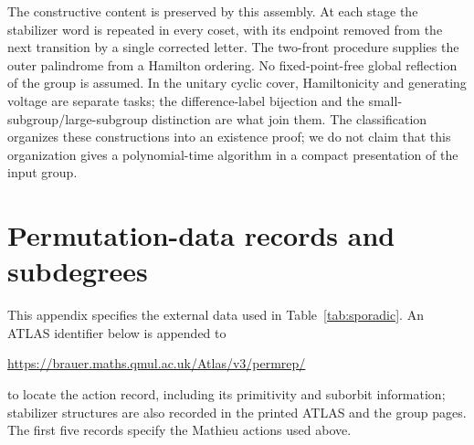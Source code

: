 \documentclass[11pt]{article}
\theoremstyle{definition}
\begin{document}
The constructive content is preserved by this assembly. At each stage the stabilizer word is repeated in every coset, with its endpoint removed from the next transition by a single corrected letter. The two-front procedure supplies the outer palindrome from a Hamilton ordering. No fixed-point-free global reflection of the group is assumed. In the unitary cyclic cover, Hamiltonicity and generating voltage are separate tasks; the difference-label bijection and the small-subgroup/large-subgroup distinction are what join them. The classification organizes these constructions into an existence proof; we do not claim that this organization gives a polynomial-time algorithm in a compact presentation of the input group.

\appendix
\section{Permutation-data records and subdegrees}\label{app:data}
This appendix specifies the external data used in Table~\ref{tab:sporadic}. An ATLAS identifier below is appended to
\begin{center}\url{https://brauer.maths.qmul.ac.uk/Atlas/v3/permrep/}\end{center}
to locate the action record, including its primitivity and suborbit information; stabilizer structures are also recorded in the printed ATLAS and the group pages. The first five records specify the Mathieu actions used above.
\end{document}
